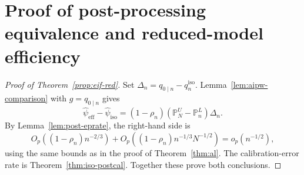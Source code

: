 \documentclass{article}
\theoremstyle{plain}
\theoremstyle{definition}
\newcommand{\1}{\mathbf{1}}
\newcommand{\rhon}{\rho_n}
\newcommand{\Pl}{\mathbb{P}^{L}_n}
\newcommand{\Pu}{\mathbb{P}^{U}_N}
\begin{document}
\section{Proof of post-processing equivalence and reduced-model efficiency}
\label{app:eff}

\begin{proof}[Proof of Theorem~\ref{prop:eif-red}]
Set \(\Delta_n=q_{0\mid n}-q_n^{\mathrm{iso}}\).
Lemma~\ref{lem:aipw-comparison} with \(g=q_{0\mid n}\) gives
\[
\widehat\psi_{\mathrm{eff}}-\widehat\psi_{\mathrm{iso}}
=(1-\rhon)(\Pu-\Pl)\Delta_n.
\]
By Lemma~\ref{lem:post-eprate}, the right-hand side is
\[
O_p((1-\rhon)n^{-2/3})
+O_p((1-\rhon)n^{-1/3}N^{-1/2})
=o_p(n^{-1/2}),
\]
using the same bounds as in the proof of Theorem~\ref{thm:al}.
The calibration-error rate is Theorem~\ref{thm:iso-postcal}.
Together these prove both conclusions.
\end{proof}
\end{document}
